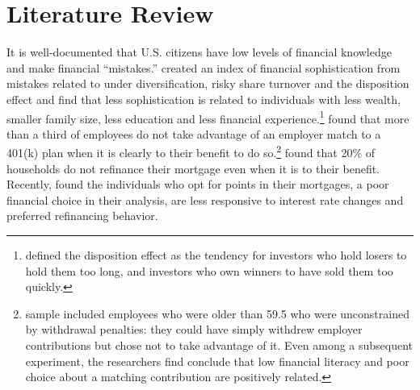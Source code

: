 \documentclass[12pt]{article}
\theoremstyle{plain}
\begin{document}
\section{Literature Review}
It is well-documented that U.S. citizens have low levels of financial knowledge and make financial ``mistakes.'' \cite{calvet2009measuring} created an index of financial sophistication from mistakes related to under diversification, risky share turnover and the disposition effect and find that less sophistication is related to individuals with less wealth, smaller family size, less education  and less financial experience.\footnote{\cite{odean1998investors} defined the disposition effect as the tendency for investors who hold losers to hold them too long, and investors who own winners to have sold them too quickly. }  \cite{choi2011100} found that more than a third of employees do not take advantage of an employer match to a 401(k) plan when it is clearly to their benefit to do so.\footnote{\cite{choi2011100} sample included employees who were older than 59.5 who were unconstrained by withdrawal penalties: they could have simply withdrew employer contributions but chose not to take advantage of it.   Even among a subsequent experiment, the researchers find conclude that low financial literacy and poor choice about a matching contribution are positively related.}    \cite{keys2016failure} found that 20\% of households do not refinance their mortgage even when it is to their benefit.  Recently, \cite{systematicmistakes} found the individuals who opt for points in their mortgages, a poor financial choice in their analysis, are less responsive to interest rate changes and preferred refinancing behavior.
\end{document}
